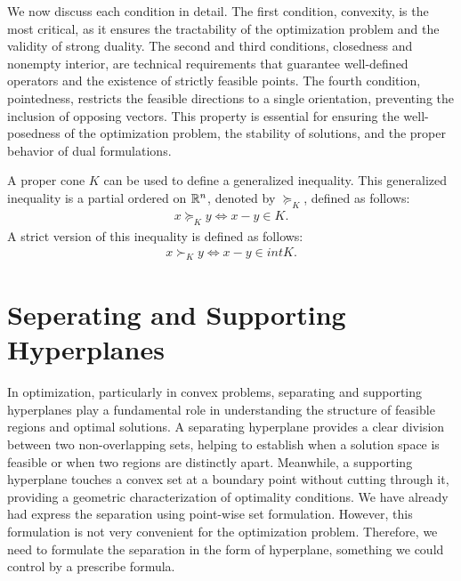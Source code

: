 \documentclass[a4paper, 12pt]{book}
\begin{document}
We now discuss each condition in detail. The first condition, convexity, is the most critical, as it ensures the tractability of the optimization problem and the validity of strong duality. The second and third conditions, closedness and nonempty interior, are technical requirements that guarantee well-defined operators and the existence of strictly feasible points. The fourth condition, pointedness, restricts the feasible directions to a single orientation, preventing the inclusion of opposing vectors. This property is essential for ensuring the well-posedness of the optimization problem, the stability of solutions, and the proper behavior of dual formulations.

A proper cone $K$ can be used to define a generalized inequality. This generalized inequality is a partial ordered on $\mathbb{R}^n$, denoted by $\succeq_K$, defined as follows:
\begin{align*}
    x \succeq_K y \Longleftrightarrow x - y \in K.
\end{align*}
A strict version of  this inequality is defined as follows:
\begin{align*}
    x \succ_K y \Longleftrightarrow x - y \in int K.
\end{align*}






\section{Seperating and Supporting Hyperplanes}
\label{sec:seperating_and_supporting_hyperplanes}

In optimization, particularly in convex problems, separating and supporting hyperplanes play a fundamental role in understanding the structure of feasible regions and optimal solutions. A separating hyperplane provides a clear division between two non-overlapping sets, helping to establish when a solution space is feasible or when two regions are distinctly apart. Meanwhile, a supporting hyperplane touches a convex set at a boundary point without cutting through it, providing a geometric characterization of optimality conditions. We have already had express the separation using point-wise set formulation. However, this formulation is not very convenient for the optimization problem. Therefore, we need to formulate the separation in the form of hyperplane, something we could control by a prescribe formula.


\end{document}
